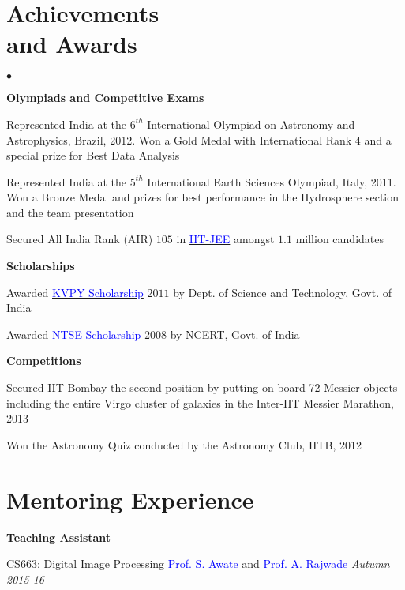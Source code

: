 \documentclass[margin,line]{res}
\newenvironment{list1}{
  \begin{list}{\ding{113}}{%
      \setlength{\itemsep}{0in}
      \setlength{\parsep}{0in} \setlength{\parskip}{0in}
      \setlength{\topsep}{0in} \setlength{\partopsep}{0in} 
      \setlength{\leftmargin}{0.17in}}}{\end{list}}
\newenvironment{list2}{
  \begin{list}{$\bullet$}{%
      \setlength{\itemsep}{0in}
      \setlength{\parsep}{0in} \setlength{\parskip}{0in}
      \setlength{\topsep}{0in} \setlength{\partopsep}{0in} 
      \setlength{\leftmargin}{0.2in}}}{\end{list}}
\begin{document}
\begin{resume}
\section{\sc Achievements \\and Awards}
\begin{list2}
\item[\strut\hspace{0.5cm}\textbf{Olympiads and Competitive Exams}]
\item Represented India at the $6^{th}$ International Olympiad on Astronomy and Astrophysics, Brazil, 2012. Won a Gold Medal with International Rank 4 and a special prize for Best Data Analysis
\item Represented India at the $5^{th}$ International Earth Sciences Olympiad, Italy, 2011. Won a Bronze Medal and prizes for best performance in the Hydrosphere section and the team presentation
\item  Secured All India Rank (AIR) $105$ in \href{https://en.wikipedia.org/wiki/Indian_Institute_of_Technology_Joint_Entrance_Examination}{\textcolor{blue}{IIT-JEE}} amongst $1.1$ million candidates
\vspace{0.05in}
\item[\strut\hspace{0.5cm}\textbf{Scholarships}]
\item Awarded \href{http://www.kvpy.iisc.ernet.in/main/index.htm}{\textcolor{blue}{KVPY Scholarship}} $2011$ by Dept. of Science and Technology, Govt. of India
\item Awarded \href{http://www.ncert.nic.in/programmes/talent_exam/index_talent.html}{\textcolor{blue}{NTSE Scholarship}} $2008$ by NCERT, Govt. of India
\item[\strut\hspace{0.5cm}\textbf{Competitions}]
\item Secured IIT Bombay the second position by putting on board 72 Messier objects including the entire Virgo cluster of galaxies in the Inter-IIT Messier Marathon, 2013
\item Won the Astronomy Quiz conducted by the Astronomy Club, IITB, 2012
\end{list2}


\section{\sc Mentoring Experience}
\textbf{Teaching Assistant}
\begin{list1}
\item[]CS663: Digital Image Processing \hspace{0.5cm} \href{https://www.cse.iitb.ac.in/~suyash}{\textcolor{blue}{Prof. S. Awate}} and \href{https://www.cse.iitb.ac.in/~ajitvr}{\textcolor{blue}{Prof. A. Rajwade}} \hfill{\textit{Autumn 2015-16}}
\end{list1}


\end{resume}
\end{document}
